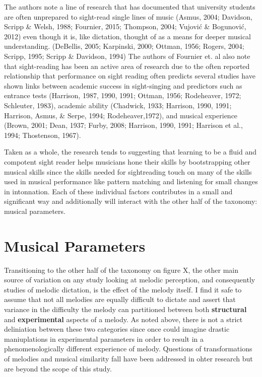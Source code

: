 \documentclass[]{book}
\theoremstyle{definition}
\theoremstyle{definition}
\theoremstyle{definition}
\theoremstyle{remark}
\begin{document}
The authors note a line of research that has documented that university
students are often unprepared to sight-read single lines of music
(Asmus, 2004; Davidson, Scripp \& Welsh, 1988; Fournier, 2015; Thompson,
2004; Vujović \& Bogunović, 2012) even though it is, like dictation,
thought of as a means for deeper musical understanding. (DeBellis, 2005;
Karpinski, 2000; Ottman, 1956; Rogers, 2004; Scripp, 1995; Scripp \&
Davidson, 1994) The authors of Fournier et. al also note that
sight-reading has been an active area of research due to the often
reported relationship that performance on sight reading often predicts
several studies have shown links between academic success in
sight-singing and predictors such as entrance tests (Harrison, 1987,
1990, 1991; Ottman, 1956; Rodeheaver, 1972; Schleuter, 1983), academic
ability (Chadwick, 1933; Harrison, 1990, 1991; Harrison, Asmus, \&
Serpe, 1994; Rodeheaver,1972), and musical experience (Brown, 2001;
Dean, 1937; Furby, 2008; Harrison, 1990, 1991; Harrison et al., 1994;
Thostenson, 1967).

Taken as a whole, the research tends to suggesting that learning to be a
fluid and compotent sight reader helps musicians hone their skills by
bootstrapping other musical skills since the skills needed for
sightreading touch on many of the skills used in musical performance
like pattern matching and listening for small changes in intonnation.
Each of these individual factors contributes in a small and significant
way and additionally will interact with the other half of the taxonomy:
musical parameters.

\hypertarget{musical-parameters}{%
\section{Musical Parameters}\label{musical-parameters}}

Transitioning to the other half of the taxonomy on figure X, the other
main source of variation on any study looking at melodic perception, and
consequently studies of melodic dictation, is the effect of the melody
itself. I find it safe to assume that not all melodies are equally
difficult to dictate and assert that variance in the difficulty the
melody can partitioned between both \textbf{structural} and
\textbf{experimental} aspects of a melody. As noted above, there is not
a strict deliniation between these two categories since once could
imagine drastic maniuplations in experimental parameters in order to
result in a phenomenologically different experience of melody. Questions
of transformations of melodies and musical similarity fall have been
addressed in ohter research
\citep{cambouropoulosHowSimilarSimilar2009, wigginsModelsMusicalSimilarity2007}
but are beyond the scope of this study.
\end{document}
